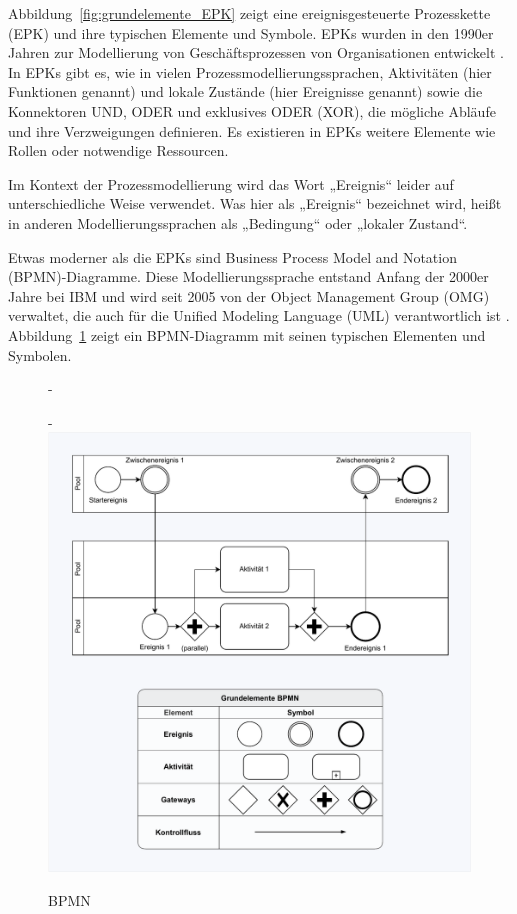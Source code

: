 Abbildung~\ref{fig:grundelemente_EPK} zeigt eine ereignisgesteuerte Prozesskette (EPK) 
und ihre typischen Elemente und Symbole. EPKs wurden in den 1990er Jahren zur Modellierung von Geschäftsprozessen von Organisationen entwickelt \cite{kel92}. In EPKs gibt es, wie in vielen Prozessmodellierungssprachen, Aktivitäten (hier Funktionen genannt) und lokale Zustände (hier Ereignisse genannt) sowie die Konnektoren UND, ODER und exklusives ODER (XOR), die mögliche Abläufe und ihre Verzweigungen definieren. Es existieren in EPKs weitere Elemente wie Rollen oder notwendige Ressourcen.

Im Kontext der Prozessmodellierung wird das Wort „Ereignis“ leider auf unterschiedliche Weise verwendet. Was hier als „Ereignis“ bezeichnet wird, heißt in anderen Modellierungssprachen als „Bedingung“ oder „lokaler Zustand“.

Etwas moderner als die EPKs sind 
Business Process Model and Notation (BPMN)-Diagramme. Diese Modellierungssprache entstand Anfang der 2000er Jahre bei IBM und wird seit 2005 von der Object Management Group (OMG) verwaltet, die auch für die Unified Modeling Language (UML) verantwortlich ist \cite{wes24}. Abbildung~\ref{fig:grundelemente_BPMN} zeigt ein BPMN-Diagramm mit seinen typischen Elementen und Symbolen.

\begin{figure}[!htbp]
	\begin{addmargin*}[0cm]{-\marginparwidth}
	\begin{addmargin*}[0cm]{-\marginparsep}
		\centering
		\includegraphics[scale=0.9]{Bilder/Kapitel-5/grundelemente_BPMN.pdf}
		\caption{BPMN}
		\label{fig:grundelemente_BPMN}
	\end{addmargin*}
	\end{addmargin*}
\end{figure}

